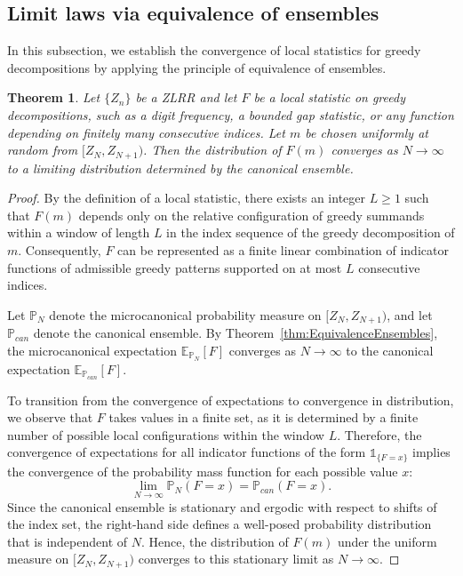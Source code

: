\documentclass[11pt]{amsart}
\theoremstyle{plain}
\numberwithin{equation}{section} %
\newtheorem{theorem}[thm]{Theorem}
\numberwithin{table}{section} %
\numberwithin{figure}{section}
\begin{document}
	
	\subsection{Limit laws via equivalence of ensembles}
	
	In this subsection, we establish the convergence of local statistics for greedy decompositions by applying the principle of equivalence of ensembles.
	
	\begin{theorem}
		\label{limit-laws}
		Let $\{Z_{n}\}$ be a ZLRR and let $F$ be a local statistic on greedy decompositions, such as a digit frequency, a bounded gap statistic, or any function depending on finitely many consecutive indices. Let $m$ be chosen uniformly at random from $[Z_{N}, Z_{N+1})$. Then the distribution of $F(m)$ converges as $N \rightarrow \infty$ to a limiting distribution determined by the canonical ensemble.
	\end{theorem}
	
	\begin{proof}
		By the definition of a local statistic, there exists an integer $L \ge 1$ such that $F(m)$ depends only on the relative configuration of greedy summands within a window of length $L$ in the index sequence of the greedy decomposition of $m$. Consequently, $F$ can be represented as a finite linear combination of indicator functions of admissible greedy patterns supported on at most $L$ consecutive indices.
		
		Let $\mathbb{P}_{N}$ denote the microcanonical probability measure on $[Z_{N}, Z_{N+1})$, and let $\mathbb{P}_{can}$ denote the canonical ensemble. By Theorem~\ref{thm:EquivalenceEnsembles}, the microcanonical expectation $\mathbb{E}_{\mathbb{P}_{N}}[F]$ converges as $N \rightarrow \infty$ to the canonical expectation $\mathbb{E}_{\mathbb{P}_{can}}[F]$. 
		
		To transition from the convergence of expectations to convergence in distribution, we observe that $F$ takes values in a finite set, as it is determined by a finite number of possible local configurations within the window $L$. Therefore, the convergence of expectations for all indicator functions of the form $\mathbb{1}_{\{F=x\}}$ implies the convergence of the probability mass function for each possible value $x$:
		\[
		\lim_{N \rightarrow \infty} \mathbb{P}_{N}(F=x) = \mathbb{P}_{can}(F=x).
		\]
		Since the canonical ensemble is stationary and ergodic with respect to shifts of the index set, the right-hand side defines a well-posed probability distribution that is independent of $N$. Hence, the distribution of $F(m)$ under the uniform measure on $[Z_{N}, Z_{N+1})$ converges to this stationary limit as $N \rightarrow \infty$.
	\end{proof}
	
\end{document}

